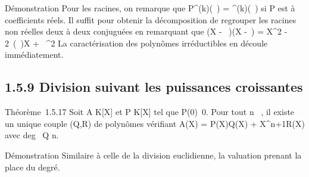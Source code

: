 Démonstration Pour les racines, on remarque que
P^(k)(\overline\alpha~) =
\overlineP^(k)(\alpha~) si P est à coefficients
réels. Il suffit pour obtenir la décomposition de regrouper les racines
non réelles deux à deux conjuguées en remarquant que (X - \beta~)(X
-\overline\beta~) = X^2 -
2\mathrmRe~(\beta~)X +
\beta~^2 La caractérisation des polynômes
irréductibles en découle immédiatement.

\subsection{1.5.9 Division suivant les puissances croissantes}

Théorème~1.5.17 Soit A \in K[X] et P \in K[X] tel que
P(0)\neq~0. Pour tout n \in {}~, il existe un unique
couple (Q,R) de polynômes vérifiant A(X) = P(X)Q(X) +
X^n+1R(X) avec deg~ Q \leq n.

Démonstration Similaire à celle de la division euclidienne, la valuation
prenant la place du degré.
